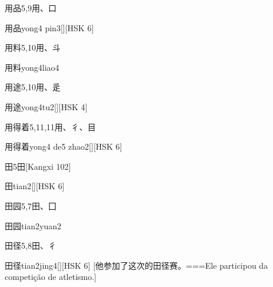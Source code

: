 \begin{Entry}{用品}{5,9}{⽤、⼝}
  \begin{Phonetics}{用品}{yong4 pin3}[][HSK 6]
  \end{Phonetics}
\end{Entry}

\begin{Entry}{用料}{5,10}{⽤、⽃}
  \begin{Phonetics}{用料}{yong4liao4}
  \end{Phonetics}
\end{Entry}

\begin{Entry}{用途}{5,10}{⽤、⾡}
  \begin{Phonetics}{用途}{yong4tu2}[][HSK 4]
  \end{Phonetics}
\end{Entry}

\begin{Entry}{用得着}{5,11,11}{⽤、⼻、⽬}
  \begin{Phonetics}{用得着}{yong4 de5 zhao2}[][HSK 6]
  \end{Phonetics}
\end{Entry}

\begin{Entry}{田}{5}{⽥}[Kangxi 102]
  \begin{Phonetics}{田}{tian2}[][HSK 6]
  \end{Phonetics}
\end{Entry}

\begin{Entry}{田园}{5,7}{⽥、⼞}
  \begin{Phonetics}{田园}{tian2yuan2}
  \end{Phonetics}
\end{Entry}

\begin{Entry}{田径}{5,8}{⽥、⼻}
  \begin{Phonetics}{田径}{tian2jing4}[][HSK 6]
    [他参加了这次的田径赛。===Ele participou da competição de atletismo.]
  \end{Phonetics}
\end{Entry}

